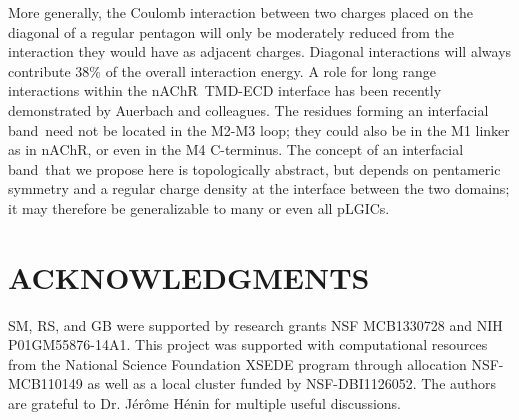 \documentclass[journal=jacsat,manuscript=article]{achemso}
\newcommand{\GABAA}{GABA\textsubscript{A}R\xspace}
\newcommand{\plgics}{pLGICs}
\newcommand{\plgic}{pLGIC~}
\newcommand{\nachr}{nAChR~}
\newcommand{\fivering}{interfacial band~}
\begin{document}
More generally, the Coulomb interaction between two charges placed on the diagonal of a regular pentagon will only be moderately reduced from the interaction they would have as adjacent charges. Diagonal interactions will always contribute $38\%$ of the overall interaction energy.  A role for long range interactions within the \nachr TMD-ECD interface has been recently demonstrated by Auerbach and colleagues\cite{Gupta2017}.  The residues forming an \fivering  need not be located in the M2-M3 loop; they could also be in the M1 linker as in nAChR, or even in the M4 C-terminus.  The concept of an \fivering that we propose here is topologically abstract, but depends on pentameric symmetry and a regular charge density at the interface between the two domains; it may therefore be generalizable to many or even all \plgics.    %


\section*{ACKNOWLEDGMENTS}
SM, RS, and GB were supported by research grants  NSF MCB1330728 and NIH P01GM55876-14A1. This project was supported with computational resources from the National Science Foundation XSEDE program through allocation NSF-MCB110149 as well as a local cluster funded by NSF-DBI1126052.  The authors are grateful to Dr. J\'{e}r\^{o}me H\'{e}nin for multiple useful discussions.  


\end{document}
